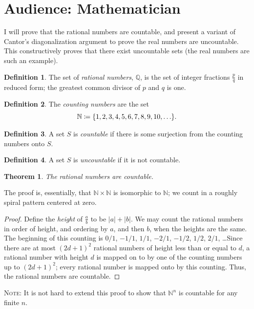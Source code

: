 \documentclass[letterpaper,11pt,showproblems]{pset}
\newtheorem*{thm*}{Theorem}
\theoremstyle{definition} \newtheorem{defn}{Definition}[section]
\theoremstyle{definition} \newtheorem*{defn*}{Definition}
\newcommand{\defeq}{\mathrel{\mathrel{\mathop:}\mkern -1.2mu=}}%
\begin{document}
\section{Audience: Mathematician}
  I will prove that the rational numbers are countable, and present a variant of Cantor's diagonalization argument to prove the real numbers are uncountable.  This constructively proves that there exist uncountable sets (the real numbers are such an example). %
  \begin{defn*}
    The set of \emph{rational numbers}, $\mathbb Q$, is the set of integer fractions $\frac{p}{q}$ in reduced form; the greatest common divisor of $p$ and $q$ is one.
  \end{defn*}
  \begin{defn*}
    The \emph{counting numbers} are the set $$\mathbb N \defeq \{1, 2, 3, 4, 5, 6, 7, 8, 9, 10, \ldots\}.$$
  \end{defn*}
  \begin{defn*}
    A set $S$ is \emph{countable} if there is some surjection from the counting numbers onto $S$.
  \end{defn*}
  \begin{defn*}
    A set $S$ is \emph{uncountable} if it is not countable.
  \end{defn*}
  \begin{thm*}
    The rational numbers are countable.
  \end{thm*}
  The proof is, essentially, that $\mathbb N \times \mathbb N$ is isomorphic to $\mathbb N$; we count in a roughly spiral pattern centered at zero.
  \begin{proof}
    Define the \emph{height} of $\frac{a}{b}$ to be $|a| + |b|$.  We may count the rational numbers in order of height, and ordering by $a$, and then $b$, when the heights are the same.  The beginning of this counting is $0 / 1$, $-1 / 1$, $1 / 1$, $-2 / 1$, $-1 / 2$, $1 / 2$, $2 / 1$, \ldots  Since there are at most $(2d+1)^2$ rational numbers of height less than or equal to $d$, a rational number with height $d$ is mapped on to by one of the counting numbers up to $(2d+1)^2$; every rational number is mapped onto by this counting.  Thus, the rational numbers are countable.
  \end{proof}
  \noindent \textsc{Note}: It is not hard to extend this proof to show that $\mathbb N^n$ is countable for any finite $n$.
  
\end{document}

